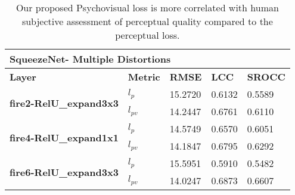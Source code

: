 \documentclass[10pt,twocolumn,letterpaper]{article}
\begin{document}
\begin{table*}[]
\centering
\caption{Our proposed Psychovisual loss is more correlated with human subjective assessment of perceptual quality compared to the perceptual loss.}
\begin{tabular}{|l|l|l|l|l|}
\hline
\multicolumn{5}{|l|}{\textbf{SqueezeNet- Multiple Distortions}}                                                   \\ \hline
\textbf{Layer}                                  & \textbf{Metric} & \textbf{RMSE} & \textbf{LCC} & \textbf{SROCC} \\ \hline
\multirow{2}{*}{\textbf{fire2-RelU\_expand3x3}} & \textbf{$l_{p}$}              & 15.2720       & 0.6132       & 0.5589         \\ \cline{2-5} 
                                                & \textbf{$l_{pv}$}             & 14.2447       & 0.6761       & 0.6110         \\ \hline
\multirow{2}{*}{\textbf{fire4-RelU\_expand1x1}} & \textbf{$l_{p}$}              & 14.5749       & 0.6570       & 0.6051         \\ \cline{2-5} 
                                                & \textbf{$l_{pv}$}             & 14.1847       & 0.6795       & 0.6292         \\ \hline
\multirow{2}{*}{\textbf{fire6-RelU\_expand3x3}} & \textbf{$l_{p}$}              & 15.5951       & 0.5910       & 0.5482         \\ \cline{2-5} 
                                                & \textbf{$l_{pv}$}             & 14.0247       & 0.6873       & 0.6607         \\ \hline
\end{tabular}
\end{table*}
\end{document}
